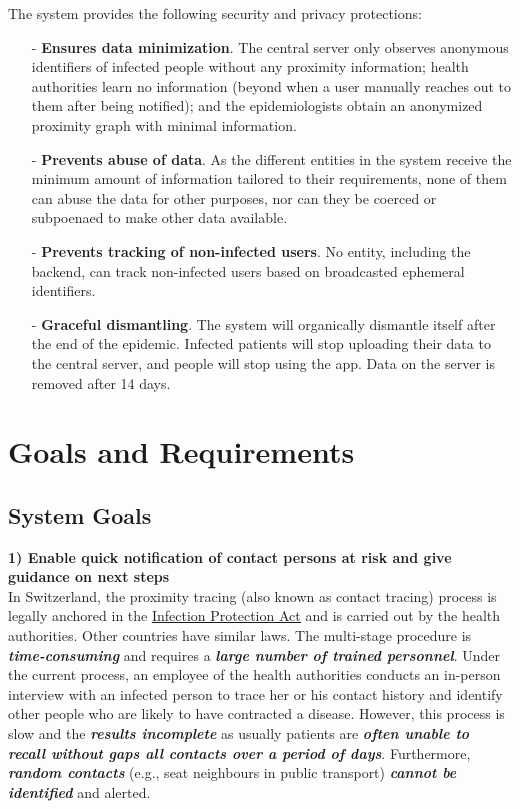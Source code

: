 \documentclass[12pt,a4paper]{article}
\begin{document}
The system provides the following security and privacy protections:
\begin{itemize}\itemsep0pt
\item[-] \textbf{Ensures data minimization}. The central server only observes anonymous identifiers of infected people without any proximity information; health authorities learn no information (beyond when a user manually reaches out to them after being notified);
and the epidemiologists obtain an anonymized proximity graph with minimal information.
\item[-] \textbf{Prevents abuse of data}. As the different entities in the system receive the minimum amount of information tailored to their requirements, none of them can abuse the data for other purposes, nor can they be coerced or subpoenaed to make other data available.
\item[-] \textbf{Prevents tracking of non-infected users}. No entity, including the backend, can track non-infected users based on broadcasted ephemeral identifiers.
\item[-] \textbf{Graceful dismantling}. The system will organically dismantle itself after the end of the epidemic. Infected patients will stop uploading their data to the central server,
and people will stop using the app. Data on the server is removed after 14 days.
\end{itemize}
\clearpage
\section*{Goals and Requirements}
\subsection*{System Goals}
\textbf{1) Enable quick notification of contact persons at risk and give guidance on next
steps}\\
In Switzerland, the proximity tracing (also known as contact tracing) process is legally
anchored in the \href{http://www.rki.de}{\underline{Infection Protection Act}} and is carried out by the health authorities. Other countries have similar laws. The multi-stage procedure is \textbf{\textit{time-consuming}} and requires a \textbf{\textit{large number of trained personnel}}. Under the current process, an employee of the health authorities conducts an in-person interview with an infected person to trace her or his contact history and identify other people who are likely to have contracted a disease. However, this process is slow and the \textbf{\textit{results incomplete}} as usually patients are \textbf{\textit{often unable to recall without gaps all contacts over a period of days}}. Furthermore, \textbf{\textit{random contacts}} (e.g., seat neighbours in public transport) \textbf{\textit{cannot be identified}}  and alerted.
\end{document}
